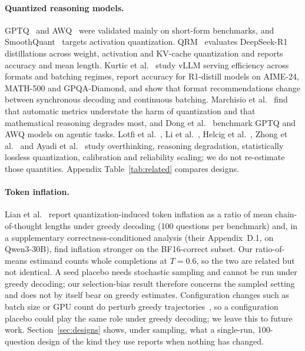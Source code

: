 \documentclass[11pt,a4paper]{article}
\begin{document}
\paragraph{Quantized reasoning models.} GPTQ~\cite{frantar2022gptq} and AWQ~\cite{lin2023awq} were validated mainly on short-form benchmarks, and SmoothQuant~\cite{xiao2023smoothquant} targets activation quantization. QRM~\cite{liu2025qrm} evaluates DeepSeek-R1 distillations across weight, activation and KV-cache quantization and reports accuracy and mean length. Kurtic et al.~\cite{kurtic2025give} study vLLM serving efficiency across formats and batching regimes, report accuracy for R1-distill models on AIME-24, MATH-500 and GPQA-Diamond, and show that format recommendations change between synchronous decoding and continuous batching. Marchisio et al.~\cite{marchisio2024quant} find that automatic metrics understate the harm of quantization and that mathematical reasoning degrades most, and Dong et al.~\cite{acbench2025} benchmark GPTQ and AWQ models on agentic tasks. Lotfi et al.~\cite{lotfi2026overthinking}, Li et al.~\cite{li2025quantmeets}, Helcig et al.~\cite{helcig2026slq}, Zhong et al.~\cite{zhong2025quantized} and Ayadi et al.~\cite{ayadi2026reliability} study overthinking, reasoning degradation, statistically lossless quantization, calibration and reliability scaling; we do not re-estimate those quantities. Appendix Table~\ref{tab:related} compares designs.

\paragraph{Token inflation.} Lian et al.~\cite{lian2026quantinflates} report quantization-induced token inflation as a ratio of mean chain-of-thought lengths under greedy decoding (100 questions per benchmark) and, in a supplementary correctness-conditioned analysis (their Appendix~D.1, on Qwen3-30B), find inflation stronger on the BF16-correct subset. Our ratio-of-means estimand counts whole completions at $T=0.6$, so the two are related but not identical. A seed placebo needs stochastic sampling and cannot be run under greedy decoding; our selection-bias result therefore concerns the sampled setting and does not by itself bear on greedy estimates. Configuration changes such as batch size or GPU count do perturb greedy trajectories~\cite{yuan2025nondeterminism}, so a configuration placebo could play the same role under greedy decoding; we leave this to future work. Section~\ref{sec:designs} shows, under sampling, what a single-run, 100-question design of the kind they use reports when nothing has changed.
\end{document}
